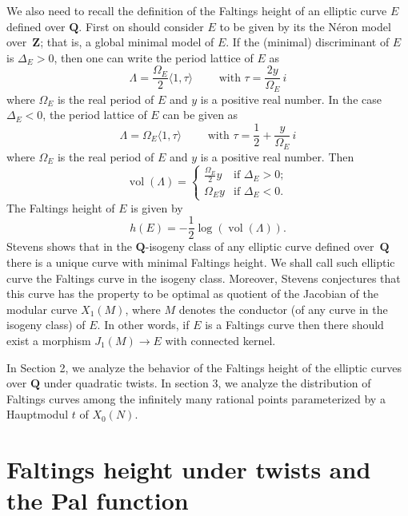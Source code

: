 \documentclass[
  journal=small,
  manuscript=article-type,  %
  year=2020,
  volume=37,
]{cup-journal}
\begin{document}
We also need to recall the definition of the Faltings height of an elliptic curve $E$ defined over $\mathbf{Q}$. First on should consider $E$ to be given by its the Néron model over~$\mathbf{Z}$; that is, a global minimal model of $E$. If the (minimal) discriminant of $E$ is $\Delta_E>0$, then one can write the period lattice of $E$ as 
$$
\Lambda = \frac{\Omega_E}{2} \langle 1, \tau \rangle \qquad
\text{ with $\tau= \frac{2y}{ \Omega_E} \, i$}
$$
where $\Omega_E$ is the real period of $E$ and $y$ is a positive real number. In the case $\Delta_E<0$, the period lattice of $E$ can be given as
$$
\Lambda = \Omega_E \langle 1, \tau \rangle \qquad
\text{ with $\tau= \frac{1}{2} + \frac{y}{ \Omega_E} \, i$}
$$
where $\Omega_E$ is the real period of $E$ and $y$ is a positive real number. Then
$$
\operatorname{vol}(\Lambda)  =
\begin{cases}
\displaystyle{\frac{\Omega_E}{2}} y & \text{if $\Delta_E>0 $};\\[6pt]
\Omega_E y & \text{if $\Delta_E<0 $}.
\end{cases}
$$
The Faltings height of $E$ is given by
$$
h(E) = -\frac{1}{2} \log ( \operatorname{vol}(\Lambda) ).
$$
Stevens \cite{STEVENS} shows that in the $\mathbf{Q}$-isogeny class of any elliptic curve defined over~$\mathbf{Q}$ there is a unique curve with minimal Faltings height. We shall call such elliptic curve the Faltings curve in the isogeny class. Moreover, Stevens conjectures that this curve has the property to be optimal as quotient of the Jacobian of the modular curve $X_1(M)$, where $M$ denotes the conductor (of any curve in the isogeny class) of $E$. In other words, if $E$ is a Faltings curve then there should exist a morphism $J_1(M) \longrightarrow E$ with connected kernel.

In Section 2, we analyze the behavior of the Faltings height 
of the elliptic curves over $\mathbf{Q}$ under quadratic twists. In section 3,  we analyze the distribution of Faltings curves
among the infinitely many rational points 
parameterized by a Hauptmodul $t$ of $X_0(N)$.

\section{Faltings height under twists and the Pal function}
\end{document}
